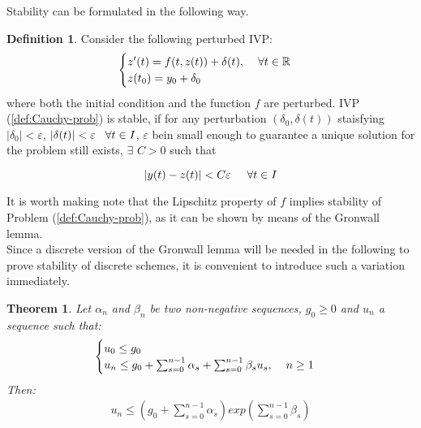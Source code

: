 \documentclass[11pt]{article}
\theoremstyle{theorem}
\newtheorem{theorem}{Theorem}
\theoremstyle{definition}
\newtheorem{definition}{Definition}
\begin{document}
Stability can be formulated in the following way.

\begin{definition}
	\label{def:stability}
	Consider the following perturbed IVP:
	\begin{align}
	\label{eqn:pert-prob}
	\begin{cases}
	z'(t)=f(t,z(t))+\delta(t),\hspace{4mm}\forall t\in\mathbb{R}\\
	z(t_0)=y_0+\delta_0
	\end{cases}
	\end{align}
	where both the initial condition and the function $f$ are perturbed. IVP (\ref{def:Cauchy-prob}) is stable, if for any perturbation $(\delta_0, \delta(t))$ staisfying $|\delta_0|<\varepsilon$, $|\delta(t)|<\varepsilon\hspace{3mm}\forall t\in I$, $\varepsilon$ bein small enough to guarantee a unique solution for the problem still exists, $\exists$ $C>0$ such that 
	
	$$|y(t)-z(t)|<C\varepsilon\hspace{5mm}\forall t\in I$$ 
\end{definition}

It is worth making note that the Lipschitz property of $f$ implies stability of Problem (\ref{def:Cauchy-prob}), as it can be shown by means of the Gronwall lemma.\\

Since a discrete version of the Gronwall lemma will be needed in the following to prove
stability of discrete schemes, it is convenient to introduce such a variation immediately.

\begin{theorem}
	\label{thm:Gronwall-discrete}
	Let $\alpha_n$ and $\beta_n$ be two non-negative sequences, $g_0\ge 0$ and $u_n$ a sequence such that:
	\begin{align}
	\begin{cases}
	u_0\le g_0\\
	u_n\le g_0 + \sum_{s=0}^{n-1}\alpha_s + \sum_{s=0}^{n-1}\beta_su_s, \hspace{4mm}n\ge 1
	\end{cases}
	\end{align}
	Then:
	\begin{align*}
		u_n\le\left(g_0 + \sum_{s=0}^{n-1}\alpha_s\right)exp{\left(\sum_{s=0}^{n-1}\beta_s\right)}	\end{align*}
\end{theorem}
\end{document}

